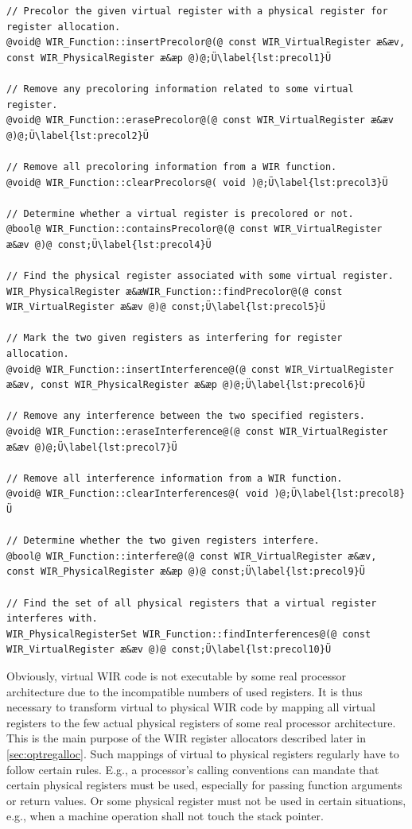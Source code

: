 \begin{lstlisting}[style=code,float=t,caption={Precoloring and Interference Handling of Class \texttt{WIR\_Function}},label=lst:precol]
// Precolor the given virtual register with a physical register for register allocation.
@void@ WIR_Function::insertPrecolor@(@ const WIR_VirtualRegister æ&æv, const WIR_PhysicalRegister æ&æp @)@;Ü\label{lst:precol1}Ü

// Remove any precoloring information related to some virtual register.
@void@ WIR_Function::erasePrecolor@(@ const WIR_VirtualRegister æ&æv @)@;Ü\label{lst:precol2}Ü

// Remove all precoloring information from a WIR function.
@void@ WIR_Function::clearPrecolors@( void )@;Ü\label{lst:precol3}Ü

// Determine whether a virtual register is precolored or not.
@bool@ WIR_Function::containsPrecolor@(@ const WIR_VirtualRegister æ&æv @)@ const;Ü\label{lst:precol4}Ü

// Find the physical register associated with some virtual register.
WIR_PhysicalRegister æ&æWIR_Function::findPrecolor@(@ const WIR_VirtualRegister æ&æv @)@ const;Ü\label{lst:precol5}Ü

// Mark the two given registers as interfering for register allocation.
@void@ WIR_Function::insertInterference@(@ const WIR_VirtualRegister æ&æv, const WIR_PhysicalRegister æ&æp @)@;Ü\label{lst:precol6}Ü

// Remove any interference between the two specified registers.
@void@ WIR_Function::eraseInterference@(@ const WIR_VirtualRegister æ&æv @)@;Ü\label{lst:precol7}Ü

// Remove all interference information from a WIR function.
@void@ WIR_Function::clearInterferences@( void )@;Ü\label{lst:precol8}Ü

// Determine whether the two given registers interfere.
@bool@ WIR_Function::interfere@(@ const WIR_VirtualRegister æ&æv, const WIR_PhysicalRegister æ&æp @)@ const;Ü\label{lst:precol9}Ü

// Find the set of all physical registers that a virtual register interferes with.
WIR_PhysicalRegisterSet WIR_Function::findInterferences@(@ const WIR_VirtualRegister æ&æv @)@ const;Ü\label{lst:precol10}Ü
\end{lstlisting}

Obviously, virtual \gls{WIR} code is not executable by some real processor architecture due to the incompatible numbers of used registers.
It is thus necessary to transform virtual to physical \gls{WIR} code by mapping all virtual registers to the few actual physical registers of some real processor architecture.
This is the main purpose of the \gls{WIR} register allocators described later in \cref{sec:optregalloc}.
Such mappings of virtual to physical registers regularly have to follow certain rules.
E.g., a processor's calling conventions can mandate that certain physical registers must be used, especially for passing function arguments or return values.
Or some physical register must not be used in certain situations, e.g., when a machine operation shall not touch the stack pointer.

